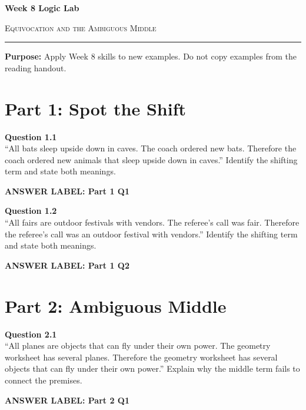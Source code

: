 \documentclass[12pt]{article}
\newcommand{\answerbox}[2]{%
\vspace{0.15em}
\noindent\textbf{#1}\par
\vspace{0.05em}
\noindent\fbox{%
\begin{minipage}[t][#2]{\dimexpr\textwidth-2\fboxsep-2\fboxrule}
\rule{\textwidth}{0pt}
\vspace{#2}
\end{minipage}
}\par
\vspace{0.25em}
}
\begin{document}
\begin{center}
{\LARGE\bfseries Week 8 Logic Lab}\par\vspace{0.05em}
{\large\scshape Equivocation and the Ambiguous Middle}\par\vspace{0.1em}
\rule{0.78\textwidth}{0.5pt}\par\vspace{0.15em}
\end{center}

\noindent\textbf{Purpose:} Apply Week 8 skills to new examples. Do not copy examples from the reading handout.

\vspace{0.3em}

\section*{Part 1: Spot the Shift}

\textbf{Question 1.1}\\[-0.15em]
``All bats sleep upside down in caves. The coach ordered new bats. Therefore the coach ordered new animals that sleep upside down in caves.'' Identify the shifting term and state both meanings.

\answerbox{ANSWER LABEL: Part 1 Q1}{2.15in}

\textbf{Question 1.2}\\[-0.15em]
``All fairs are outdoor festivals with vendors. The referee's call was fair. Therefore the referee's call was an outdoor festival with vendors.'' Identify the shifting term and state both meanings.

\answerbox{ANSWER LABEL: Part 1 Q2}{2.15in}

\newpage

\section*{Part 2: Ambiguous Middle}

\textbf{Question 2.1}\\[-0.15em]
``All planes are objects that can fly under their own power. The geometry worksheet has several planes. Therefore the geometry worksheet has several objects that can fly under their own power.'' Explain why the middle term fails to connect the premises.

\answerbox{ANSWER LABEL: Part 2 Q1}{2.45in}

\newpage
\end{document}
